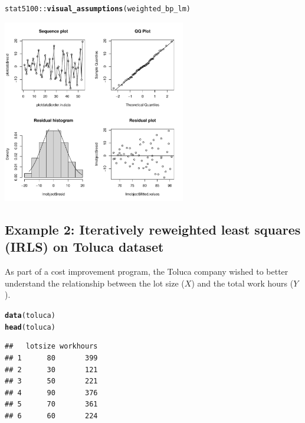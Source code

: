 \documentclass{article}\usepackage[]{graphicx}\usepackage[]{color}
\makeatletter
\newcommand{\hlopt}[1]{\textcolor[rgb]{0,0,0}{#1}}%
\newcommand{\hlstd}[1]{\textcolor[rgb]{0.345,0.345,0.345}{#1}}%
\newcommand{\hlkwd}[1]{\textcolor[rgb]{0.737,0.353,0.396}{\textbf{#1}}}%
\newenvironment{kframe}{%
 \def\at@end@of@kframe{}%
 \ifinner\ifhmode%
  \def\at@end@of@kframe{\end{minipage}}%
  \begin{minipage}{\columnwidth}%
 \fi\fi%
 \def\FrameCommand##1{\hskip\@totalleftmargin \hskip-\fboxsep
 \colorbox{shadecolor}{##1}\hskip-\fboxsep
     \hskip-\linewidth \hskip-\@totalleftmargin \hskip\columnwidth}%
 \MakeFramed {\advance\hsize-\width
   \@totalleftmargin\z@ \linewidth\hsize
   \@setminipage}}%
 {\par\unskip\endMakeFramed%
 \at@end@of@kframe}
\newenvironment{knitrout}{}{} %
\makeatother
\begin{document}
\begin{knitrout}
\color{fgcolor}\begin{kframe}
\begin{alltt}
\hlstd{stat5100}\hlopt{::}\hlkwd{visual_assumptions}\hlstd{(weighted_bp_lm)}
\end{alltt}
\end{kframe}

{\centering \includegraphics[width=0.6\textwidth]{figure/unnamed-chunk-5-1} 

}



\end{knitrout}

\newpage

\subsection*{Example 2: Iteratively reweighted least squares (IRLS) on Toluca dataset}
As part of a cost improvement program, the Toluca company wished to better understand the relationship between the lot size ($X$) and the total work hours ($Y$).

\begin{knitrout}
\color{fgcolor}\begin{kframe}
\begin{alltt}
\hlkwd{data}\hlstd{(toluca)}
\hlkwd{head}\hlstd{(toluca)}
\end{alltt}
\begin{verbatim}
##   lotsize workhours
## 1      80       399
## 2      30       121
## 3      50       221
## 4      90       376
## 5      70       361
## 6      60       224
\end{verbatim}
\end{kframe}
\end{knitrout}
\end{document}
